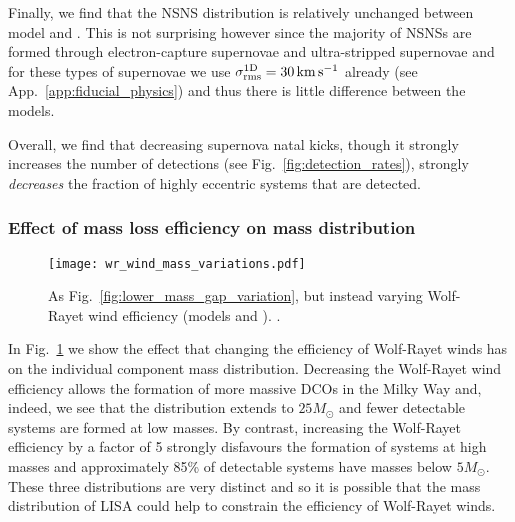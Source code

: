 Finally, we find that the NSNS distribution is relatively unchanged between model \modFid{} and \modSigLower{}. This is not surprising however since the majority of NSNSs are formed through electron-capture supernovae and ultra-stripped supernovae and for these types of supernovae we use $\sigma^{\rm 1D}_{\rm rms} = 30 \unit{km}{s^{-1}}$ already (see App.~\ref{app:fiducial_physics}) and thus there is little difference between the models.

Overall, we find that decreasing supernova natal kicks, though it strongly increases the number of detections (see Fig.~\ref{fig:detection_rates}), strongly \textit{decreases} the fraction of highly eccentric systems that are detected.

\subsubsection{Effect of mass loss efficiency on mass distribution}

\begin{figure}[tb]
    \centering
    \texttt{[image: wr\_wind\_mass\_variations.pdf]}
    \caption{As Fig.~\ref{fig:lower_mass_gap_variation}, but instead varying Wolf-Rayet wind efficiency (models \modWRLow{} and \modWRHigh{}). \href{https://github.com/TomWagg/detecting-DCOs-in-LISA/blob/main/paper/figures/wr_wind_mass_variations.pdf}{\faFileImage} \href{https://github.com/TomWagg/detecting-DCOs-in-LISA/blob/main/paper/figure_notebooks/variations.ipynb}{\faBook}.}
    \label{fig:wr_wind_mass_variations}
\end{figure}

In Fig.~\ref{fig:wr_wind_mass_variations} we show the effect that changing the efficiency of Wolf-Rayet winds has on the individual component mass distribution. Decreasing the Wolf-Rayet wind efficiency allows the formation of more massive DCOs in the Milky Way and, indeed, we see that the distribution extends to $25 \unit{M_{\odot}}$ and fewer detectable systems are formed at low masses. By contrast, increasing the Wolf-Rayet efficiency by a factor of 5 strongly disfavours the formation of systems at high masses and approximately 85\% of detectable systems have masses below $5 \unit{M_{\odot}}$. These three distributions are very distinct and so it is possible that the mass distribution of LISA could help to constrain the efficiency of Wolf-Rayet winds.
